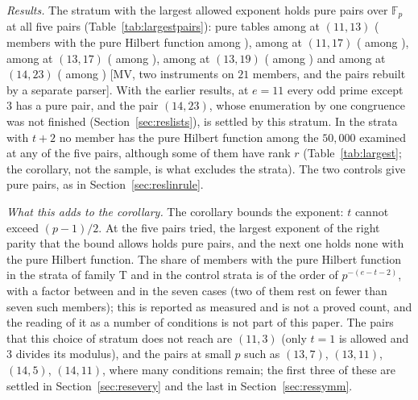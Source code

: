 \documentclass[11pt]{article}
\theoremstyle{definition}
\theoremstyle{remark}
\newcommand{\EXP}[1]{\mbox{EXP-#1}}
\newcommand{\F}{\mathbb{F}}
\begin{document}
\emph{Results.} The stratum with the largest allowed exponent holds pure pairs over $\F_p$ at all five pairs (Table~\ref{tab:largestpairs}): \nlgsElevenThirteenPure{} pure tables among \nlgsElevenThirteenTables{} at $(11,13)$ (\nlgsElevenThirteenPureHF{} members with the pure Hilbert function among \nlgsElevenThirteenExamined{}), \nlgsElevenSeventeenPure{} among \nlgsElevenSeventeenTables{} at $(11,17)$ (\nlgsElevenSeventeenPureHF{} among \nlgsElevenSeventeenExamined{}), \nlgsThirteenSeventeenPure{} among \nlgsThirteenSeventeenTables{} at $(13,17)$ (\nlgsThirteenSeventeenPureHF{} among \nlgsThirteenSeventeenExamined{}), \nlgsThirteenNineteenPure{} among \nlgsThirteenNineteenTables{} at $(13,19)$ (\nlgsThirteenNineteenPureHF{} among \nlgsThirteenNineteenExamined{}) and \nlgsFourteenTwentyThreePure{} among \nlgsFourteenTwentyThreeTables{} at $(14,23)$ (\nlgsFourteenTwentyThreePureHF{} among \nlgsFourteenTwentyThreeExamined{}) [MV, two instruments on $21$ members, and the pairs rebuilt by a separate parser]. With the earlier results, at $e=11$ every odd prime except $3$ has a pure pair, and the pair $(14,23)$, whose enumeration by one congruence was not finished (Section~\ref{sec:reslists}), is settled by this stratum. In the strata with $t+2$ no member has the pure Hilbert function among the $50{,}000$ examined at any of the five pairs, although some of them have rank $r$ (Table~\ref{tab:largest}; the corollary, not the sample, is what excludes the strata). The two controls give pure pairs, as in Section~\ref{sec:reslinrule}.

\begin{table}[htbp]
\centering\footnotesize

\caption{One pure pair over $\F_p$ at each of the five pairs of \EXP{018}: the pair, the stratum, the forms and the length of $U/(Uf+Ug)$; the script checks the stratum of each pair and recomputes the Hilbert function, the length and the rank of $\mu_{3e}$ for $e\le11$, and both instruments give the table $(1,2,2,1)$ on $(0,e,3e,4e)$.}
\label{tab:largestpairs}
\end{table}

\emph{What this adds to the corollary.} The corollary bounds the exponent: $t$ cannot exceed $(p-1)/2$. At the five pairs tried, the largest exponent of the right parity that the bound allows holds pure pairs, and the next one holds none with the pure Hilbert function. The share of members with the pure Hilbert function in the strata of family T and in the control strata is of the order of $p^{-(e-t-2)}$, with a factor between \nlgsRatioLow{} and \nlgsRatioHigh{} in the seven cases (two of them rest on fewer than seven such members); this is reported as measured and is not a proved count, and the reading of it as a number of conditions is not part of this paper. The pairs that this choice of stratum does not reach are $(11,3)$ (only $t=1$ is allowed and $3$ divides its modulus), and the pairs at small $p$ such as $(13,7)$, $(13,11)$, $(14,5)$, $(14,11)$, where many conditions remain; the first three of these are settled in Section~\ref{sec:resevery} and the last in Section~\ref{sec:ressymm}.
\end{document}
